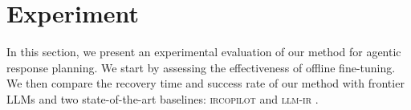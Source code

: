 \documentclass[runningheads,10pt]{llncs}
\DeclareMathOperator*{\argmin}{arg\,min}
\begin{document}


\section{Experiment}
\label{sec:experiment}
In this section, we present an experimental evaluation of our method for agentic response planning. We start by assessing the effectiveness of offline fine-tuning. We then compare the recovery time and success rate of our method with frontier LLMs and two state-of-the-art baselines: \textsc{ircopilot} \cite{guo25ircopilot} and \textsc{llm-ir} \cite{kim26ndss}.
\end{document}
